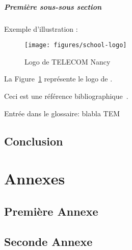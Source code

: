 \documentclass{tnreport}
\begin{document}
\subsubsection{Première sous-sous section}

Exemple d'illustration :

\begin{figure}[h]
  \centering
  \texttt{[image: figures/school-logo]}
  \caption{Logo de TELECOM Nancy}
  \label{fig:logo-tn}
\end{figure}

La Figure~\ref{fig:logo-tn} représente le logo de \reportSchool{}.

Ceci est une référence bibliographique~\cite{GOT4}.


Entrée dans le glossaire:
blabla \gls{TEM}

\cleardoublepage

\chapter{Conclusion}

\cleardoublepage
\renewcommand{\tocbibname}{Bibliographie / Webographie}


\cleardoublepage

\listoffigures
\cleardoublepage

\listoftables
\cleardoublepage

\lstlistoflistings
\cleardoublepage

\printglossaries

\cleardoublepage
\renewcommand{\thesubsection}{\Roman{subsection}}

\appendix
\part*{Annexes}
\cleardoublepage

\chapter{Première Annexe}
\cleardoublepage

\chapter{Seconde Annexe}


\cleardoublepage
\thispagestyle{empty}
\end{document}
